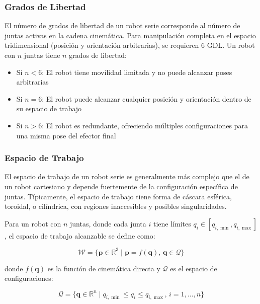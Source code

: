 \subsubsection{Grados de Libertad}

El número de grados de libertad de un robot serie corresponde al número de juntas activas en la cadena cinemática. Para manipulación completa en el espacio tridimensional (posición y orientación arbitrarias), se requieren 6 GDL. Un robot con $n$ juntas tiene $n$ grados de libertad:

\begin{itemize}
    \item Si $n < 6$: El robot tiene movilidad limitada y no puede alcanzar poses arbitrarias
    \item Si $n = 6$: El robot puede alcanzar cualquier posición y orientación dentro de su espacio de trabajo
    \item Si $n > 6$: El robot es redundante, ofreciendo múltiples configuraciones para una misma pose del efector final
\end{itemize}

\subsubsection{Espacio de Trabajo}

El espacio de trabajo de un robot serie es generalmente más complejo que el de un robot cartesiano y depende fuertemente de la configuración específica de juntas. Típicamente, el espacio de trabajo tiene forma de cáscara esférica, toroidal, o cilíndrica, con regiones inaccesibles y posibles singularidades.

Para un robot con $n$ juntas, donde cada junta $i$ tiene límites $q_i \in [q_{i,\min}, q_{i,\max}]$, el espacio de trabajo alcanzable se define como:

\begin{equation}
\mathcal{W} = \{\mathbf{p} \in \mathbb{R}^3 \mid \mathbf{p} = f(\mathbf{q}), \, \mathbf{q} \in \mathcal{Q}\}
\end{equation}

donde $f(\mathbf{q})$ es la función de cinemática directa y $\mathcal{Q}$ es el espacio de configuraciones:

\begin{equation}
\mathcal{Q} = \{\mathbf{q} \in \mathbb{R}^n \mid q_{i,\min} \leq q_i \leq q_{i,\max}, \, i = 1, \ldots, n\}
\end{equation}

